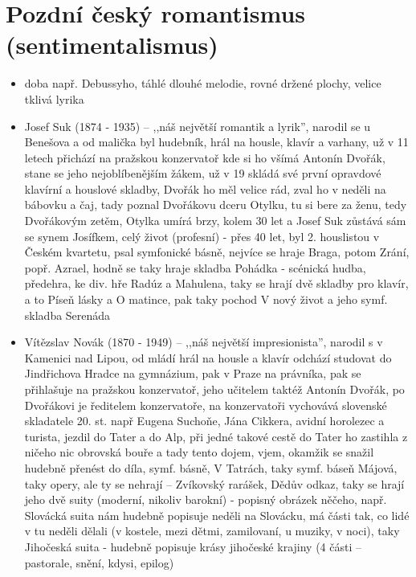 \documentclass{article}
\begin{document}
\part{Pozdní český romantismus (sentimentalismus)}
\begin{itemize}
  \item doba např. Debussyho, táhlé dlouhé melodie, rovné držené plochy, velice tklivá lyrika
  \item Josef Suk (1874 - 1935) -- ,,náš největší romantik a lyrik”, narodil se u Benešova a od malička byl hudebník, hrál na housle, klavír a varhany, už v 11 letech přichází na pražskou konzervatoř kde si ho všímá Antonín Dvořák, stane se jeho nejoblíbenějším žákem, už v 19 skládá své první opravdové klavírní a houslové skladby, Dvořák ho měl velice rád, zval ho v neděli na bábovku a čaj, tady poznal Dvořákovu dceru Otylku, tu si bere za ženu, tedy Dvořákovým zetěm, Otylka umírá brzy, kolem 30 let a Josef Suk zůstává sám se synem Josífkem, celý život (profesní) - přes 40 let, byl 2. houslistou v Českém kvartetu, psal symfonické básně, nejvíce se hraje Braga, potom Zrání, popř. Azrael, hodně se taky hraje skladba Pohádka - scénická hudba, předehra, ke div. hře Radúz a Mahulena, taky se hrají dvě skladby pro klavír, a to Píseň lásky a O matince, pak taky pochod V nový život a jeho symf. skladba Serenáda
  \item Vítězslav Novák (1870 - 1949) -- ,,náš největší impresionista”, narodil s v Kamenici nad Lipou, od mládí hrál na housle a klavír odchází studovat do Jindřichova Hradce na gymnázium, pak v Praze na právníka, pak se přihlašuje na pražskou konzervatoř, jeho učitelem taktéž Antonín Dvořák, po Dvořákovi je ředitelem konzervatoře, na konzervatoři vychovává slovenské skladatele 20. st. např Eugena Suchoňe, Jána Cikkera, avidní horolezec a turista, jezdil do Tater a do Alp, při jedné takové cestě do Tater ho zastihla z ničeho nic obrovská bouře a tady tento dojem, vjem, okamžik se snažil hudebně přenést do díla, symf. básně, V Tatrách, taky symf. báseň Májová, taky opery, ale ty se nehrají -- Zvíkovský rarášek, Dědův odkaz, taky se hrají jeho dvě suity (moderní, nikoliv barokní) - popisný obrázek něčeho, např. Slovácká suita nám hudebně popisuje neděli na Slovácku, má části tak, co lidé v tu neděli dělali (v kostele, mezi dětmi, zamilovaní, u muziky, v noci), taky Jihočeská suita - hudebně popisuje krásy jihočeské krajiny (4 části -- pastorale, snění, kdysi, epilog)

\end{itemize}
\end{document}
